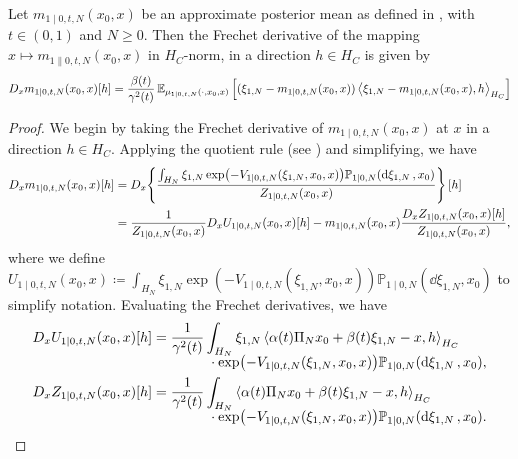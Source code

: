 \begin{lemma}\label{lem:frechetf}
  Let \(m_{1 \mid 0, t, N}(x_{0}, x)\) be an approximate posterior mean as defined in , with \(t \in(0,1)\) and \(N \geq 0\). Then the Frechet derivative of the mapping \(x \mapsto m_{1 \| 0, t, N}(x_{0}, x)\) in \(H_{C}\)-norm, in a direction \(h \in H_{C}\) is given by
  \[
    D_{x} m_{1 \mid 0, t, N}(x_{0}, x)[h] =\frac{\beta(t)}{\gamma^{2}(t)} \mathop{\mathbb{E}_{\mu_{1 \mid 0, t, N}(\cdot, x_{0}, x)}}\qty[(\xi_{1, N} - m_{1 \mid 0, t, N}(x_{0}, x)) \ev{\xi_{1, N} - m_{1 \mid 0, t, N}(x_{0}, x), h}_{H_{C}}]
  \]

  \begin{proof}
    We begin by taking the Frechet derivative of \(m_{1 \mid 0, t, N}(x_{0}, x)\) at \(x\) in a direction \(h \in H_{C}\). Applying the quotient rule (see \citealp[][Chapter 2.1]{berger1977nonlinearity}) and simplifying, we have
    \begin{align}
      D_{x} m_{1 \mid 0, t, N}(x_{0}, x)[h] &= D_{x}\qty{\frac{\int_{H_{N}} \xi_{1, N} \exp(-V_{1 \mid 0, t, N}(\xi_{1, N},x_{0}, x)) \mathbb{P}_{1 \mid 0, N}(\dd{\xi_{1, N}}, x_{0})}{ Z_{1 \mid 0, t, N}(x_{0}, x)}}[h] \notag \\
      &= \frac{1}{Z_{1 \mid 0, t, N}(x_{0}, x)} D_{x}U_{1 \mid 0, t, N}(x_{0}, x)[h] - m_{1 \mid 0, t, N}(x_{0}, x) \frac{D_{x} Z_{1 \mid 0, t, N}(x_{0}, x)[h]}{Z_{1 \mid 0, t, N}(x_{0}, x)}, \label{eqn:lem10fin}
    \end{align}
    where we define \(U_{1 \mid 0, t, N}(x _{0}, x) \coloneqq \int_{H_{N}} \xi_{1, N} \exp(-V_{1 \mid 0, t, N}(\xi_{1, N},x_{0}, x)) \mathbb{P}_{1 \mid 0, N}(\dd{\xi_{1, N}}, x_{0})\) to simplify notation. Evaluating the Frechet derivatives, we have
    \begin{align*}
      D_{x}U_{1 \mid 0, t, N}(x_{0}, x)[h] &= \frac{1}{\gamma^{2}(t)}\int_{H_{N}} \xi_{1, N} \ev{\alpha(t) \Pi_{N} x_{0} + \beta(t) \xi_{1, N} - x, h}_{H_{C}}\\[-0.5em]
      &\qquad \qquad \cdot \exp(-V_{1 \mid 0, t, N}(\xi_{1, N}, x_{0}, x)) \mathbb{P}_{1 \mid 0, N}(\dd{\xi_{1, N}}, x_{0}), \\
      D_{x} Z_{1 \mid 0, t, N}(x_{0}, x)[h] &= \frac{1}{\gamma^{2}(t)}\int_{H_{N}} \ev{\alpha(t) \Pi_{N} x_{0} + \beta(t) \xi_{1, N} - x, h}_{H_{C}} \\[-0.5em]
      &\qquad \qquad \cdot \exp(-V_{1 \mid 0, t, N}(\xi_{1, N}, x_{0}, x)) \mathbb{P}_{1 \mid 0, N}(\dd{\xi_{1, N}}, x_{0}).
    \end{align*}

\end{proof}
\end{lemma}
